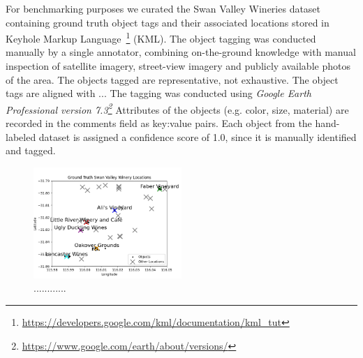 For benchmarking purposes we curated the Swan Valley Wineries dataset containing ground truth object tags and their associated locations stored in Keyhole Markup Language~\footnote{\href{https://developers.google.com/kml/documentation/kml_tut}{https://developers.google.com/kml/documentation/kml_tut}} (KML).
The object tagging was conducted manually by a single annotator, combining on-the-ground knowledge with manual inspection of satellite imagery, street-view imagery and publicly available photos of the area. 
The objects tagged are representative, not exhaustive. 
The object tags are aligned with ... 
The tagging was conducted using \textit{Google Earth Professional version 7.3\footnote{\href{https://www.google.com/earth/about/versions/}{https://www.google.com/earth/about/versions/}}}
Attributes of the objects (e.g. color, size, material) are recorded in the comments field as key:value pairs.
Each object from the hand-labeled dataset is assigned a confidence score of 1.0, since it is manually identified and tagged.


\begin{figure}[ht]
\label{fig:loc}        
\includegraphics[width=0.5\textwidth]{papers/figures/loc_labels_plot.png}
\centering
\caption[width=\textwidth]{............}
\end{figure}



